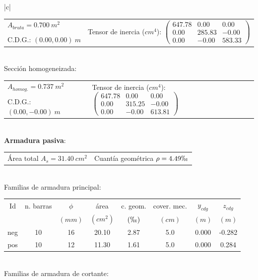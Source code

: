 \begin{table}
\begin{center}
\begin{tabular}{|c|}
\hline
\begin{tabular}{ll}
$A_{bruta}= 0.700\ m^2$ & \multirow{3}{*}{Tensor de inercia ($cm^4$): $ \left( \begin{array}{ccc}647.78 & 0.00 & 0.00 \\ 0.00 & 285.83 & -0.00 \\ 0.00 & -0.00 & 583.33 \end{array} \right)$} \\
& \\
C.D.G.: $( 0.00, 0.00)\ m$  & \\
\end{tabular} \\
\hline
Sección homogeneizada:\\
\hline
\begin{tabular}{ll}
$A_{homog.}= 0.737\ m^2$ & \multirow{3}{*}{Tensor de inercia ($cm^4$): $ \left( \begin{array}{ccc}647.78 & 0.00 & 0.00 \\ 0.00 & 315.25 & -0.00 \\ 0.00 & -0.00 & 613.81 \end{array} \right)$} \\
& \\
C.D.G.: $( 0.00,-0.00)\ m$  & \\
\end{tabular} \\
\hline
\textbf{Armadura pasiva}:\\
\hline
\begin{tabular}{ll}
Área total $A_s=31.40\ cm^2$ & Cuantía geométrica $\rho= 4.49\permil$\\
\end{tabular} \\
\hline
Familias de armadura principal:\\
\hline
\begin{tabular}{cccccccc}
Id & n. barras & $\phi$ & área & c. geom. & cover. mec. & $y_{cdg}$ & $z_{cdg}$\\
 &  & $(mm)$ & $(cm^2)$ & $(\permil)$ & $(cm)$ & $(m)$ & $(m)$\\
\hline
neg & 10 & 16 & 20.10 & 2.87 &  5.0 & 0.000 & -0.282\\
\hline
pos & 10 & 12 & 11.30 & 1.61 &  5.0 & 0.000 & 0.284\\
\end{tabular} \\
\hline
Familias de armadura de cortante:\\
\hline
\begin{tabular}{cccccccc}

\end{tabular}
\end{tabular}
\end{center}
\end{table}
